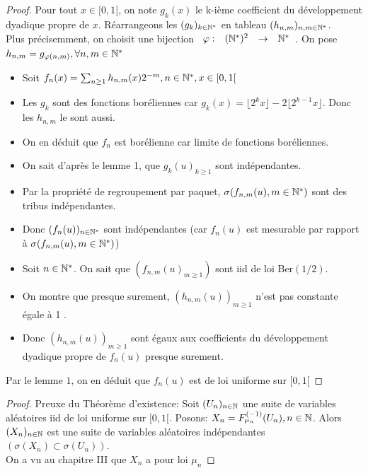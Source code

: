 \documentclass[]{report}
\begin{document}
    \begin{proof}
        Pour tout $x\in[0,1[$, on note $g_k(x)$ le k-ième coefficient du développement dyadique propre de $x$. Réarrangeons les $(g_k)_{k\in \mathbb{N}^*}$ en tableau $(h_{n,m})_{n,m\in \mathbb{N}^*}$.\\
        Plus précisemment, on choisit une bijection $\begin{array}{ccccc} \varphi : & (\mathbb{N}^*)^2 & \to & \mathbb{N}^* \end{array}$. On pose $h_{n,m}=g_{\varphi(n,m)},\forall n,m\in \mathbb{N}^*$
        \begin{itemize}
            \item Soit $f_n(x)=\sum_{n\ge 1} h_{n,m}(x)2^{-m},n\in \mathbb{N}^*,x\in [0,1[$
            \item Les $g_k$ sont des fonctions boréliennes car $g_k(x)=\lfloor 2^kx\rfloor-2\lfloor 2^{k-1}x\rfloor$. Donc les $h_{n,m}$ le sont aussi.
            \item On en déduit que $f_n$ est borélienne car limite de fonctions boréliennes.
            \item On sait d'après le lemme 1, que $g_k(u)_{k\ge 1}$ sont indépendantes.\\
            \item Par la propriété de regroupement par paquet, $\sigma(f_{n,m}(u),m\in \mathbb{N}^*)$ sont des tribus indépendantes.
            \item Donc $(f_n(u))_{n\in \mathbb{N}^*}$ sont indépendantes (car $f_n(u)$ est mesurable par rapport à $\sigma(f_{n,m}(u),m\in \mathbb{N}^*)$)
            \item Soit $n\in \mathbb{N}^*$. On sait que $(f_{n,m}(u)_{m\ge 1})$ sont iid de loi Ber$(1/2)$.
            \item On montre que presque surement, $(h_{n,m}(u))_{m\ge 1}$ n'est pas constante égale à 1 \apcr.
            \item Donc $(h_{n,m}(u))_{m\ge 1}$ sont égaux aux coefficients du développement dyadique propre de $f_n(u)$ presque surement.
        \end{itemize}
        Par le lemme $1$, on en déduit que $f_n(u)$ est de loi uniforme sur $[0,1[$
    \end{proof}

    \begin{proof}
        Preuxe du Théorème d'existence: Soit $(U_n)_{n\in\mathbb{N}}$ une suite de variables aléatoires iid de loi uniforme sur $[0,1[$. Posons: $X_n=F_{\mu_n}^{(-1)}(U_n),{n\in\mathbb{N}}$. Alors $(X_n)_{n\in\mathbb{N}}$ est une suite de variables aléatoires indépendantes $(\sigma(X_n)\subset \sigma(U_n))$.\\
        On a vu au chapitre III que $X_n$ a pour loi $\mu_n$
    \end{proof}
\end{document}
